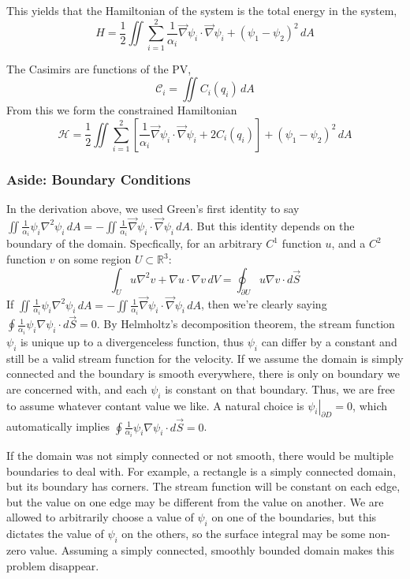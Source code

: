 \documentclass[12pt]{article}
\begin{document}
    This yields that the Hamiltonian of the system is the total energy in the system,
    $$
    H = \frac12 \iint \sum_{i=1}^2 \frac{1}{\alpha_i}\vec\nabla \psi_i \cdot \vec\nabla \psi_i + (\psi_1 - \psi_2)^2 \, dA
    $$

    The Casimirs are functions of the PV,
    $$
    \mathcal{C}_i = \iint C_i(q_i) \, dA
    $$
    From this we form the constrained Hamiltonian
    \begin{equation}
      \mathcal{H} = \frac12 \iint \sum_{i=1}^2 \left[ \frac{1}{\alpha_i} \vec\nabla \psi_i \cdot \vec\nabla \psi_i + 2C_i(q_i) \right]+ (\psi_1 - \psi_2)^2 \, dA
      \label{eqn:qg_tl_h}
    \end{equation}

    \subsubsection{Aside: Boundary Conditions}
      In the derivation above, we used Green's first identity to say $\iint \frac{1}{\alpha_i}\psi_i \nabla^2 \psi_i \, dA = - \iint \frac{1}{\alpha_i} \vec\nabla\psi_i \cdot \vec\nabla\psi_i \, dA$. But this identity depends on the boundary of the domain. Specfically, for an arbitrary $C^1$ function $u$, and a $C^2$ function $v$ on some region $U \subset \mathbb{R}^3$:
      $$
        \int_U u \nabla^2 v + \nabla u \cdot \nabla v \, dV = \oint_{\partial U} u \nabla v \cdot d \vec S
      $$
      If $\iint \frac{1}{\alpha_i}\psi_i \nabla^2 \psi_i \, dA = - \iint \frac{1}{\alpha_i} \vec\nabla\psi_i \cdot \vec\nabla\psi_i \, dA$, then we're clearly saying $\oint \frac{1}{\alpha_i}\psi_i \nabla \psi_i\cdot d \vec S = 0$. By Helmholtz's decomposition theorem, the stream function $\psi_i$ is unique up to a divergenceless function, thus $\psi_i$ can differ by a constant and still be a valid stream function for the velocity. If we assume the domain is simply connected and the boundary is smooth everywhere, there is only on boundary we are concerned with, and each $\psi_i$ is constant on that boundary. Thus, we are free to assume whatever contant value we like. A natural choice is $\left. \psi_i \right|_{\partial D} = 0$, which automatically implies $\oint \frac{1}{\alpha_i}\psi_i \nabla \psi_i \cdot d \vec S = 0$.

      If the domain was not simply connected or not smooth, there would be multiple boundaries to deal with. For example, a rectangle is a simply connected domain, but its boundary has corners. The stream function will be constant on each edge, but the value on one edge may be different from the value on another. We are allowed to arbitrarily choose a value of $\psi_i$ on one of the boundaries, but this dictates the value of $\psi_i$ on the others, so the surface integral may be some non-zero value. Assuming a simply connected, smoothly bounded domain makes this problem disappear.
\end{document}
